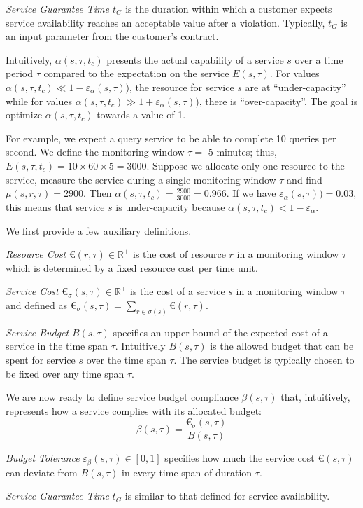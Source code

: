 \emph{Service Guarantee Time $t_G$} is the duration within which a customer expects service availability reaches an acceptable value after a violation. 
Typically, $t_G$ is an input parameter from the customer's contract.


\begin{exmp}
Intuitively, $\alpha(s,\tau,t_c)$ presents the actual capability of a service $s$ over a time period $\tau$ compared to the expectation on the service $E(s,\tau)$. 
For values $\alpha(s,\tau,t_c) \ll 1 - \varepsilon_\alpha(s,\tau))$, the resource for service $s$ are at ``under-capacity'' while for values $\alpha(s,\tau,t_c) \gg 1 + \varepsilon_\alpha(s,\tau))$, there is ``over-capacity''. The goal is optimize $\alpha(s,\tau,t_c)$ towards a value of 1.
% 

For example, we expect a query service to be able to complete 10 queries per second. 
We define the monitoring window $\tau = $ 5 minutes; thus, $E(s,\tau,t_c) = 10 \times 60 \times 5 = 3000$.
Suppose we allocate only one resource to the service,
measure the service during a single monitoring window $\tau$
and find $\mu(s,r,\tau) = 2900$. Then $\alpha(s,\tau,t_c) = \frac{2900}{3000} = 0.966$.
If we have $\varepsilon_\alpha(s,\tau)) = 0.03$, this means that service $s$ is under-capacity because $\alpha(s,\tau,t_c) < 1 - \varepsilon_\alpha$.
\end{exmp}

\begin{defn}
\label{def:budget:compliance}
% 
We first provide a few auxiliary definitions.
% 

\emph{Resource Cost} $\euro(r,\tau) \in \mathbb{R}^+$ is the cost of resource $r$ in a monitoring window $\tau$ which is determined by a fixed resource cost per time unit.

\emph{Service Cost} $\euro_\sigma(s,\tau) \in \mathbb{R}^+$ is the cost of a service $s$ in a monitoring window $\tau$ and defined as $\euro_\sigma(s,\tau) = \sum_{r \in \sigma(s)} \euro(r,\tau)$.
% 

\emph{Service Budget} $B(s,\tau)$ specifies an upper bound of the expected cost of a service in the time span $\tau$.
Intuitively $B(s,\tau)$ is the allowed budget that can be spent for service $s$ over the time span $\tau$.
The service budget is typically chosen to be fixed over any time span $\tau$.
% 

We are now ready to define service budget compliance $\beta(s,\tau)$ that,
intuitively, represents how a service complies with its allocated budget:
\[
\beta(s,\tau) = \frac{\euro_\sigma(s,\tau)}{B(s,\tau)}
\]

\emph{Budget Tolerance} $\varepsilon_\beta(s,\tau) \in [0,1]$ specifies how much the service cost $\euro(s,\tau)$ can deviate from $B(s,\tau)$ in every time span of duration $\tau$.

\emph{Service Guarantee Time} $t_G$ is similar to that defined for service availability.
% 
\end{defn} %

